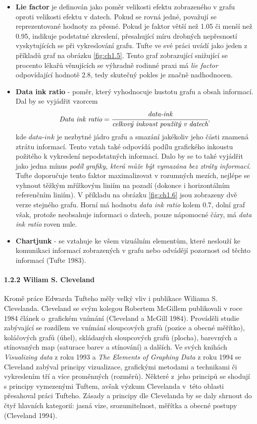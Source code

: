 \documentclass[12pt,]{article}
\let\oldparagraph\paragraph
\renewcommand{\paragraph}[1]{\oldparagraph{#1}\mbox{}}
\begin{document}
\begin{itemize}
\item
  \textbf{Lie factor} je definován jako poměr velikosti efektu
  zobrazeného v grafu oproti velikosti efektu v datech. Pokud se rovná
  jedné, považují se reprezentované hodnoty za přesné. Pokud je faktor
  větší než 1.05 či menší než 0.95, indikuje podstatné zkreslení,
  přesahující míru drobných nepřesností vyskytujících se při
  vykreslování grafu. Tufte ve své práci uvádí jako jeden z příkladů
  graf na obrázku \ref{fig:ch1.5}. Tento graf zobrazující snižující se
  procento lékařů věnujících se výhradně rodinné praxi má \emph{lie
  factor} odpovídající hodnotě 2.8, tedy skutečný pokles je značně
  nadhodnocen.
\item
  \textbf{Data ink ratio} - poměr, který vyhodnocuje hustotu grafu a
  obsah informací. Dal by se vyjádřit vzorcem
  \[\textit{Data ink ratio} = \cfrac{\textit{data-ink}}{\textit{celkový inkoust použitý v datech}},\]
  kde \(\textit{data-ink}\) je nezbytné jádro grafu a smazání jakékoliv
  jeho části znamená ztrátu informací. Tento vztah také odpovídá podílu
  grafického inkoustu požitého k vykreslení nepodstatných informací.
  Dalo by se to také vyjádřit jako jedna mínus
  \textit{podíl grafiky, která může být vymazána bez ztráty informací}.
  Tufte doporučuje tento faktor maximalizovat v rozumných mezích,
  nejlépe se vyhnout těžkým mřížkovým liniím na pozadí (dokonce i
  horizontálním referenčním liniím). V příkladu na obrázku
  \ref{fig:ch1.6} jsou zobrazeny dvě verze stejného grafu. Horní má
  hodnotu \emph{data ink ratio} kolem 0.7, dolní graf však, protože
  neobsahuje informaci o datech, pouze nápomocné čáry, má \emph{data ink
  ratio} roven nule.
\item
  \textbf{Chartjunk} - se vztahuje ke všem vizuálním elementům, které
  neslouží ke komunikaci informací zobrazených v grafu nebo odvádějí
  pozornost od těchto informací (Tufte 1983).
\end{itemize}

\hypertarget{cleveland}{\paragraph{1.2.2 Wiliam S.
Cleveland}\label{cleveland}}

\qquad Kromě práce Edwarda Tufteho měly velký vliv i publikace Wiliama
S. Clevelanda. Cleveland se svým kolegou Robertem McGillem publikovali v
roce 1984 článek o~grafickém vnímání (Cleveland a McGill 1984).
Prováděli studie zabývající se rozdílem ve vnímání sloupcových grafů
(pozice a obecné měřítko), koláčových grafů (úhel), skládaných
sloupcových grafů (plocha), barevných a stínovaných map (saturace barev
a stínování) a dalších. Ve svých knihách \emph{Visualizing data} z roku
1993 a \emph{The Elements of Graphing Data} z roku 1994 se Cleveland
zabýval principy vizualizace, grafickými metodami a technikami či
vykreslením tří a více proměnných (rozměrů). Některé z~jeho principů se
shodují s principy vymezenými Tuftem, avšak výzkum Clevelanda v~této
oblasti přesahoval práci Tufteho. Zásady a principy dle Clevelanda by se
daly shrnout do čtyř hlavních kategorií: jasná vize, srozumitelnost,
měřítka a obecné postupy (Cleveland 1994).
\end{document}
